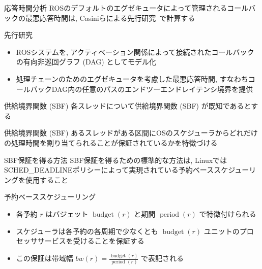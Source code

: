 \begin{frame}{応答時間分析}
    ROSのデフォルトのエグゼキュータによって管理されるコールバックの最悪応答時間は, Casiniらによる先行研究~\cite{casini2019response}で計算する
    \begin{block}{先行研究~\cite{casini2019response}}
        \begin{itemize}
            \item ROSシステムを, アクティベーション関係によって接続されたコールバックの有向非巡回グラフ (DAG) としてモデル化
            \item 処理チェーンのためのエグゼキュータを考慮した最悪応答時間, すなわちコールバックDAG内の任意のパスのエンドツーエンドレイテンシ境界を提供
        \end{itemize}
    \end{block}
\end{frame}

\begin{frame}{供給境界関数 (SBF)}
    各スレッドについて供給境界関数 (SBF) が既知であるとする
    \begin{block}{供給境界関数 (SBF)}
        あるスレッドがある区間にOSのスケジューラからどれだけの処理時間を割り当てられることが保証されているかを特徴づける
    \end{block}
\end{frame}

\begin{frame}{SBF保証を得る方法}
    SBF保証を得るための標準的な方法は, LinuxではSCHED\_DEADLINEポリシーによって実現されている予約ベーススケジューリングを使用すること
    \begin{block}{予約ベーススケジューリング}
        \setlength{\linewidth}{0.98\columnwidth}
        \begin{itemize}
            \item 各予約 $r$ はバジェット $\operatorname{budget}(r)$ と期間 $\operatorname{period}(r)$ で特徴付けられる
            \item スケジューラは各予約の各周期で少なくとも $\operatorname{budget}(r)$ ユニットのプロセッササービスを受けることを保証する
            \item この保証は帯域幅 $b w(r)=\frac{\operatorname{budget}(r)}{\text { period }(r)}$ で表記される
        \end{itemize}
    \end{block}
\end{frame}

